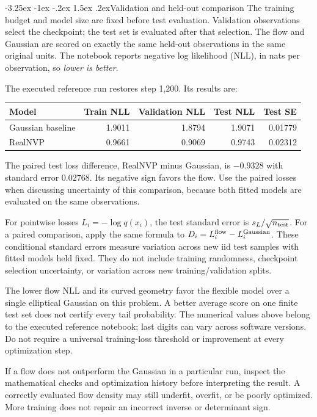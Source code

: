 \documentclass[11pt,a4paper]{article}
\makeatletter
\renewcommand\subsection{\@startsection{subsection}{2}{\z@}%
  {-3.25ex \@plus -1ex \@minus -.2ex}%
  {1.5ex \@plus .2ex}{\normalfont\large}}
\makeatother
\begin{document}
\subsection{Validation and held-out comparison}
The training budget and model size are fixed before test evaluation.
Validation observations select the checkpoint; the test set is evaluated after
that selection. The flow and Gaussian are scored on exactly the same held-out
observations in the same original units. The notebook reports negative log
likelihood (NLL), in nats per observation, so \emph{lower is better}.

The executed reference run restores step 1,200. Its results are:
\begin{center}
\begin{tabular}{@{}lrrrr@{}}
\toprule
Model & Train NLL & Validation NLL & Test NLL & Test SE \\
\midrule
Gaussian baseline & 1.9011 & 1.8794 & 1.9071 & 0.01779 \\
RealNVP & 0.9661 & 0.9069 & 0.9743 & 0.02312 \\
\bottomrule
\end{tabular}
\end{center}
The paired test loss difference, RealNVP minus Gaussian, is $-0.9328$ with
standard error $0.02768$. Its negative sign favors the flow. Use the paired
losses when discussing uncertainty of this comparison, because both fitted
models are evaluated on the same observations.

For pointwise losses $L_i=-\log q(x_i)$, the test standard error is
$s_L/\sqrt{n_{\rm test}}$. For a paired comparison, apply the same formula to
$D_i=L_i^{\rm flow}-L_i^{\rm Gaussian}$. These conditional standard errors
measure variation across new iid test samples with fitted models held fixed.
They do not include training randomness, checkpoint selection uncertainty,
or variation across new training/validation splits.

The lower flow NLL and its curved geometry favor the flexible model over a
single elliptical Gaussian on this problem. A better average score on one
finite test set does not certify every tail probability. The numerical values
above belong to the executed reference notebook; last digits can vary across
software versions. Do not require a universal training-loss threshold or
improvement at every optimization step.

If a flow does not outperform the Gaussian in a particular run, inspect the
mathematical checks and optimization history before interpreting the result.
A correctly evaluated flow density may still underfit, overfit, or be poorly
optimized. More training does not repair an incorrect inverse or determinant
sign.
\end{document}
